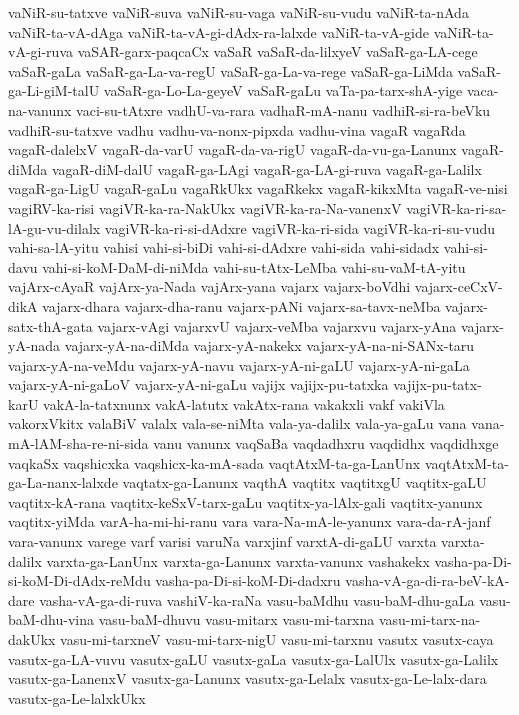 {vaNiR-su-tatxve
vaNiR-suva
vaNiR-su-vaga
vaNiR-su-vudu
vaNiR-ta-nAda
vaNiR-ta-vA-dAga
vaNiR-ta-vA-gi-dAdx-ra-lalxde
vaNiR-ta-vA-gide
vaNiR-ta-vA-gi-ruva
vaSAR-garx-paqcaCx
vaSaR
vaSaR-da-lilxyeV
vaSaR-ga-LA-cege
vaSaR-gaLa
vaSaR-ga-La-va-regU
vaSaR-ga-La-va-rege
vaSaR-ga-LiMda
vaSaR-ga-Li-giM-talU
vaSaR-ga-Lo-La-geyeV
vaSaR-gaLu
vaTa-pa-tarx-shA-yige
vaca-na-vanunx
vaci-su-tAtxre
vadhU-va-rara
vadhaR-mA-nanu
vadhiR-si-ra-beVku
vadhiR-su-tatxve
vadhu
vadhu-va-nonx-pipxda
vadhu-vina
vagaR
vagaRda
vagaR-dalelxV
vagaR-da-varU
vagaR-da-va-rigU
vagaR-da-vu-ga-Lanunx
vagaR-diMda
vagaR-diM-dalU
vagaR-ga-LAgi
vagaR-ga-LA-gi-ruva
vagaR-ga-Lalilx
vagaR-ga-LigU
vagaR-gaLu
vagaRkUkx
vagaRkekx
vagaR-kikxMta
vagaR-ve-nisi
vagiRV-ka-risi
vagiVR-ka-ra-NakUkx
vagiVR-ka-ra-Na-vanenxV
vagiVR-ka-ri-sa-lA-gu-vu-dilalx
vagiVR-ka-ri-si-dAdxre
vagiVR-ka-ri-sida
vagiVR-ka-ri-su-vudu
vahi-sa-lA-yitu
vahisi
vahi-si-biDi
vahi-si-dAdxre
vahi-sida
vahi-sidadx
vahi-si-davu
vahi-si-koM-DaM-di-niMda
vahi-su-tAtx-LeMba
vahi-su-vaM-tA-yitu
vajArx-cAyaR
vajArx-ya-Nada
vajArx-yana
vajarx
vajarx-boVdhi
vajarx-ceCxV-dikA
vajarx-dhara
vajarx-dha-ranu
vajarx-pANi
vajarx-sa-tavx-neMba
vajarx-satx-thA-gata
vajarx-vAgi
vajarxvU
vajarx-veMba
vajarxvu
vajarx-yAna
vajarx-yA-nada
vajarx-yA-na-diMda
vajarx-yA-nakekx
vajarx-yA-na-ni-SANx-taru
vajarx-yA-na-veMdu
vajarx-yA-navu
vajarx-yA-ni-gaLU
vajarx-yA-ni-gaLa
vajarx-yA-ni-gaLoV
vajarx-yA-ni-gaLu
vajijx
vajijx-pu-tatxka
vajijx-pu-tatx-karU
vakA-la-tatxnunx
vakA-latutx
vakAtx-rana
vakakxli
vakf
vakiVla
vakorxVkitx
valaBiV
valalx
vala-se-niMta
vala-ya-dalilx
vala-ya-gaLu
vana
vana-mA-lAM-sha-re-ni-sida
vanu
vanunx
vaqSaBa
vaqdadhxru
vaqdidhx
vaqdidhxge
vaqkaSx
vaqshicxka
vaqshicx-ka-mA-sada
vaqtAtxM-ta-ga-LanUnx
vaqtAtxM-ta-ga-La-nanx-lalxde
vaqtatx-ga-Lanunx
vaqthA
vaqtitx
vaqtitxgU
vaqtitx-gaLU
vaqtitx-kA-rana
vaqtitx-keSxV-tarx-gaLu
vaqtitx-ya-lAlx-gali
vaqtitx-yanunx
vaqtitx-yiMda
varA-ha-mi-hi-ranu
vara
vara-Na-mA-le-yanunx
vara-da-rA-janf
vara-vanunx
varege
varf
varisi
varuNa
varxjinf
varxtA-di-gaLU
varxta
varxta-dalilx
varxta-ga-LanUnx
varxta-ga-Lanunx
varxta-vanunx
vashakekx
vasha-pa-Di-si-koM-Di-dAdx-reMdu
vasha-pa-Di-si-koM-Di-dadxru
vasha-vA-ga-di-ra-beV-kA-dare
vasha-vA-ga-di-ruva
vashiV-ka-raNa
vasu-baMdhu
vasu-baM-dhu-gaLa
vasu-baM-dhu-vina
vasu-baM-dhuvu
vasu-mitarx
vasu-mi-tarxna
vasu-mi-tarx-na-dakUkx
vasu-mi-tarxneV
vasu-mi-tarx-nigU
vasu-mi-tarxnu
vasutx
vasutx-caya
vasutx-ga-LA-vuvu
vasutx-gaLU
vasutx-gaLa
vasutx-ga-LalUlx
vasutx-ga-Lalilx
vasutx-ga-LanenxV
vasutx-ga-Lanunx
vasutx-ga-Lelalx
vasutx-ga-Le-lalx-dara
vasutx-ga-Le-lalxkUkx
}

